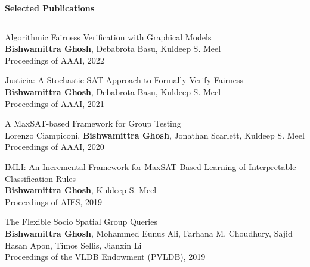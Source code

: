 \documentclass[a4paper,11pt,final]{article}
\newcommand{\Sep}{\vspace{1.5em}}
\newcommand{\SmallSep}{\vspace{0.5em}}
\begin{document}
\Sep
\Large { \textbf{Selected Publications}}\\
\noindent\rule{\textwidth}{1pt}
\normalsize


	

	
	
\SmallSep

	\begin{enumerate}[{[}1{]}]
		\item {Algorithmic Fairness Verification with Graphical Models} \\
		\textbf{Bishwamittra Ghosh}, Debabrota Basu, Kuldeep S. Meel\\
		Proceedings of AAAI, 2022
		\item {Justicia: A Stochastic SAT Approach to Formally Verify Fairness} \\
		\textbf{Bishwamittra Ghosh}, Debabrota Basu, Kuldeep S. Meel\\
		Proceedings of AAAI, 2021
		\item 	{A MaxSAT-based Framework for Group Testing} \\
		Lorenzo Ciampiconi, \textbf{Bishwamittra Ghosh}, Jonathan Scarlett, Kuldeep S. Meel\\
		Proceedings of AAAI, 2020
		\item {IMLI: An Incremental Framework for MaxSAT-Based Learning of Interpretable \\ Classification Rules}\\
		\textbf{Bishwamittra Ghosh}, Kuldeep S. Meel\\
		Proceedings of AIES, 2019
		\item 	{The Flexible Socio Spatial Group Queries}\\
		\textbf{Bishwamittra Ghosh}, Mohammed Eunus Ali, Farhana M. Choudhury,
		Sajid Hasan Apon, Timos Sellis, Jianxin Li\\
		Proceedings of the VLDB Endowment (PVLDB), 2019\\
		
	\end{enumerate}





%
\end{document}
